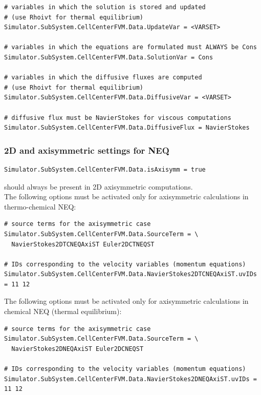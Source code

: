 \documentclass[11pt]{article}
\begin{document}
\begin{lstlisting}[breaklines]
# variables in which the solution is stored and updated 
# (use Rhoivt for thermal equilibrium)
Simulator.SubSystem.CellCenterFVM.Data.UpdateVar = <VARSET>

# variables in which the equations are formulated must ALWAYS be Cons
Simulator.SubSystem.CellCenterFVM.Data.SolutionVar = Cons

# variables in which the diffusive fluxes are computed 
# (use Rhoivt for thermal equilibrium)
Simulator.SubSystem.CellCenterFVM.Data.DiffusiveVar = <VARSET>

# diffusive flux must be NavierStokes for viscous computations
Simulator.SubSystem.CellCenterFVM.Data.DiffusiveFlux = NavierStokes
\end{lstlisting}

\subsubsection{2D and axisymmetric settings for NEQ}

\begin{lstlisting}[breaklines]
Simulator.SubSystem.CellCenterFVM.Data.isAxisymm = true
\end{lstlisting}
should always be present in 2D axisymmetric computations. \\

The following options must be activated only for axisymmetric calculations in thermo-chemical NEQ:

\begin{lstlisting}[breaklines]
# source terms for the axisymmetric case
Simulator.SubSystem.CellCenterFVM.Data.SourceTerm = \
  NavierStokes2DTCNEQAxiST Euler2DCTNEQST

# IDs corresponding to the velocity variables (momentum equations) 
Simulator.SubSystem.CellCenterFVM.Data.NavierStokes2DTCNEQAxiST.uvIDs = 11 12
\end{lstlisting}

The following options must be activated only for axisymmetric calculations in chemical NEQ (thermal equilibrium):

\begin{lstlisting}[breaklines]
# source terms for the axisymmetric case
Simulator.SubSystem.CellCenterFVM.Data.SourceTerm = \
  NavierStokes2DNEQAxiST Euler2DCNEQST

# IDs corresponding to the velocity variables (momentum equations) 
Simulator.SubSystem.CellCenterFVM.Data.NavierStokes2DNEQAxiST.uvIDs = 11 12
\end{lstlisting}
\end{document}
